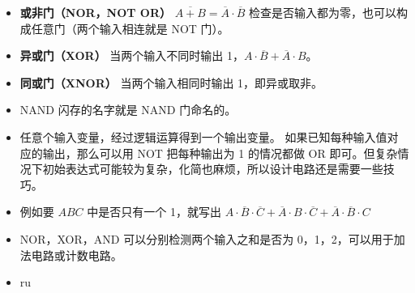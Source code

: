 \begin{itemize}
\item \textbf{或非门（NOR，NOT OR）} $\overline{A+B}=\overline A\cdot\overline B$ 检查是否输入都为零，也可以构成任意门（两个输入相连就是 NOT 门）。
\item \textbf{异或门（XOR）} 当两个输入不同时输出 1，$A\cdot\overline B+\overline A\cdot B$。
\item \textbf{同或门（XNOR）} 当两个输入相同时输出 1，即异或取非。
\item NAND 闪存的名字就是 NAND 门命名的。
\item 任意个输入变量，经过逻辑运算得到一个输出变量。 如果已知每种输入值对应的输出，那么可以用 NOT 把每种输出为 1 的情况都做 OR 即可。但复杂情况下初始表达式可能较为复杂，化简也麻烦，所以设计电路还是需要一些技巧。
\item 例如要 $ABC$ 中是否只有一个 1，就写出 $A\cdot\overline B\cdot\overline C + \overline A\cdot B\cdot\overline C + \overline A\cdot\overline B\cdot C$
\item NOR，XOR，AND 可以分别检测两个输入之和是否为 0，1，2，可以用于加法电路或计数电路。
\item ru
\end{itemize}
